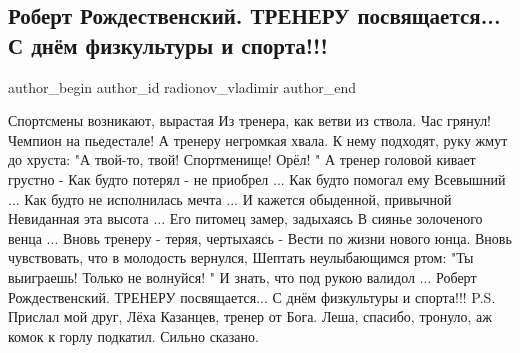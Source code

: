  
 
 
 
 
 
\subsection{Роберт Рождественский. ТРЕНЕРУ посвящается... С днём физкультуры и спорта!!!}
\label{sec:12_09_2015.fb.radionov_vladimir.1.treneru_den_fiz_i_sporta}
 
\ifcmt
 author_begin
   author_id radionov_vladimir
 author_end
\fi

Спортсмены возникают, вырастая
 Из тренера, как ветви из ствола.
Час грянул! Чемпион на пьедестале!
А тренеру негромкая хвала.
К нему подходят, руку жмут до хруста:
 "А твой-то, твой!
Спортменище!
Орёл! "
А тренер головой кивает грустно -
Как будто потерял - не приобрел ...
Как будто помогал ему Всевышний ...
Как будто не исполнилась мечта ...
И кажется обыденной, привычной
 Невиданная эта высота ...
Его питомец замер, задыхаясь
 В сиянье золоченого венца ...
Вновь тренеру - теряя, чертыхаясь -
Вести по жизни нового юнца.
Вновь чувствовать, что в молодость вернулся,
Шептать неулыбающимся ртом:
 "Ты выиграешь!
Только не волнуйся! "
И знать,
что под рукою валидол ... Роберт Рождественский. ТРЕНЕРУ посвящается... С днём физкультуры и спорта!!!
P.S. Прислал мой друг, Лёха Казанцев, тренер от Бога. Леша, спасибо, тронуло, аж комок к горлу подкатил. Сильно сказано.

